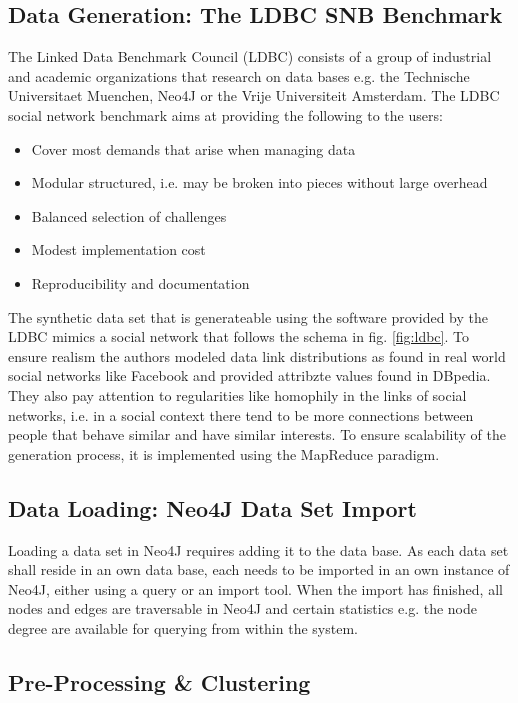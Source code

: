 \subsection{Data Generation: The LDBC SNB Benchmark}
The Linked Data Benchmark Council (LDBC) consists of a group of industrial and academic organizations that research on data bases e.g. the Technische Universitaet Muenchen, Neo4J or the Vrije Universiteit Amsterdam. The LDBC social network benchmark aims at providing the following to the users:
\begin{itemize}
    \item Cover most demands that arise when managing data
    \item Modular structured, i.e. may be broken into pieces without large overhead
    \item Balanced selection of challenges
    \item Modest implementation cost
    \item Reproducibility and documentation
\end{itemize}
The synthetic data set that is generateable using the software provided by the LDBC mimics a social network that follows the schema in fig. \ref{fig:ldbc}. To ensure realism the authors modeled data link distributions as found in real world social networks like Facebook and provided attribzte values found in DBpedia. They also pay attention to regularities like homophily in the links of social networks, i.e. in a social context there tend to be more connections between people that behave similar and have similar interests. To ensure scalability of the generation process, it is implemented using the MapReduce paradigm.

\subsection{Data Loading: Neo4J Data Set Import}
Loading a data set in Neo4J requires adding it to the data base. As each data set shall reside in an own data base, each needs to be imported in an own instance of Neo4J, either using a query or an import tool. When the import has finished, all nodes and edges are traversable in Neo4J and certain statistics e.g. the node degree are available for querying from within the system. 

\subsection{Pre-Processing \& Clustering}

